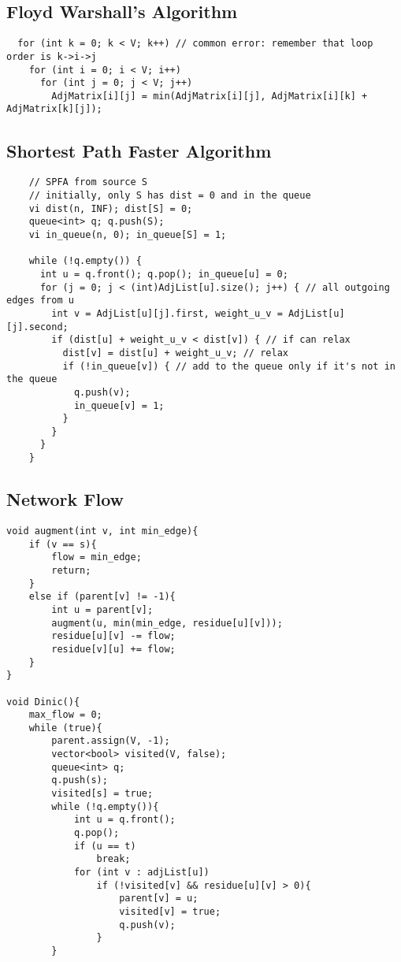 \documentclass[10pt,landscape]{article}
\begin{document}
\begin{multicols}{2}
\subsection{Floyd Warshall's Algorithm}
\begin{lstlisting}
  for (int k = 0; k < V; k++) // common error: remember that loop order is k->i->j
    for (int i = 0; i < V; i++)
      for (int j = 0; j < V; j++)
        AdjMatrix[i][j] = min(AdjMatrix[i][j], AdjMatrix[i][k] + AdjMatrix[k][j]);
\end{lstlisting}
\newpage

\subsection{Shortest Path Faster Algorithm}
\begin{lstlisting}
    // SPFA from source S
    // initially, only S has dist = 0 and in the queue
    vi dist(n, INF); dist[S] = 0;
    queue<int> q; q.push(S);
    vi in_queue(n, 0); in_queue[S] = 1;

    while (!q.empty()) {
      int u = q.front(); q.pop(); in_queue[u] = 0;
      for (j = 0; j < (int)AdjList[u].size(); j++) { // all outgoing edges from u
        int v = AdjList[u][j].first, weight_u_v = AdjList[u][j].second;
        if (dist[u] + weight_u_v < dist[v]) { // if can relax
          dist[v] = dist[u] + weight_u_v; // relax
          if (!in_queue[v]) { // add to the queue only if it's not in the queue
            q.push(v);
            in_queue[v] = 1;
          }
        }
      }
    }
\end{lstlisting}

\subsection{Network Flow}
\begin{lstlisting}
void augment(int v, int min_edge){
    if (v == s){
        flow = min_edge;
        return;
    }
    else if (parent[v] != -1){
        int u = parent[v];
        augment(u, min(min_edge, residue[u][v]));
        residue[u][v] -= flow;
        residue[v][u] += flow;
    }
}

void Dinic(){
    max_flow = 0;
    while (true){
        parent.assign(V, -1);
        vector<bool> visited(V, false);
        queue<int> q;
        q.push(s);
        visited[s] = true;
        while (!q.empty()){
            int u = q.front();
            q.pop();
            if (u == t)
                break;
            for (int v : adjList[u])
                if (!visited[v] && residue[u][v] > 0){
                    parent[v] = u;
                    visited[v] = true;
                    q.push(v);
                }
        }


\end{lstlisting}
\end{multicols}
\end{document}
